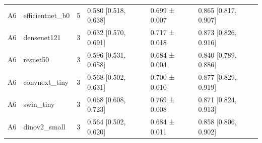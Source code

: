\begin{table}
\begin{tabular}{llrlll}
A6 & efficientnet\_b0 & 5 & 0.580 [0.518, 0.638] & 0.699 ± 0.007 & 0.865 [0.817, 0.907] \\
A6 & densenet121 & 3 & 0.632 [0.570, 0.691] & 0.717 ± 0.018 & 0.873 [0.826, 0.916] \\
A6 & resnet50 & 3 & 0.596 [0.531, 0.658] & 0.684 ± 0.004 & 0.840 [0.789, 0.886] \\
A6 & convnext\_tiny & 3 & 0.568 [0.502, 0.631] & 0.700 ± 0.010 & 0.877 [0.829, 0.919] \\
A6 & swin\_tiny & 3 & 0.668 [0.608, 0.723] & 0.769 ± 0.008 & 0.871 [0.824, 0.913] \\
A6 & dinov2\_small & 3 & 0.564 [0.502, 0.620] & 0.684 ± 0.011 & 0.858 [0.806, 0.902] \\
\bottomrule
\end{tabular}
\end{table}
